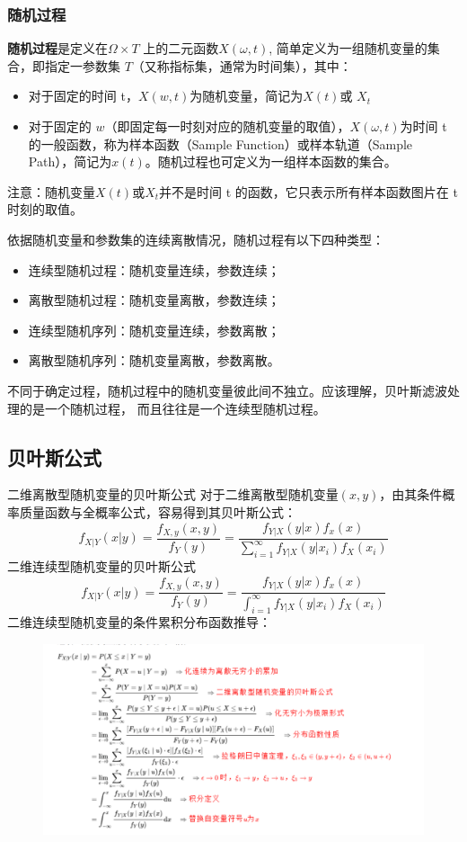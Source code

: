 \documentclass[12pt]{ctexart}
\begin{document}
\subsubsection{随机过程}
\textbf{随机过程}是定义在$\Omega × T$ 上的二元函数$X(\omega,t)$, 简单定义为一组随机变量的集合，即指定一参数集 $T$（又称指标集，通常为时间集），其中：
\begin{itemize}
    \item 对于固定的时间 t，$X(w,t)$为随机变量，简记为$X(t)$或 $X_t$
    \item 对于固定的 $w$（即固定每一时刻对应的随机变量的取值），$X(\omega,t)$为时间 t 的一般函数，称为样本函数（Sample Function）或样本轨道（Sample Path），简记为$x(t)$。随机过程也可定义为一组样本函数的集合。
\end{itemize}

注意：随机变量$X(t)$或$X_t$并不是时间 t 的函数，它只表示所有样本函数图片在 t 时刻的取值。

依据随机变量和参数集的连续离散情况，随机过程有以下四种类型：
\begin{itemize}
    \item 连续型随机过程：随机变量连续，参数连续；
    \item 离散型随机过程：随机变量离散，参数连续；
    \item 连续型随机序列：随机变量连续，参数离散；
    \item 离散型随机序列：随机变量离散，参数离散。
\end{itemize}

不同于确定过程，随机过程中的随机变量彼此间不独立。应该理解，贝叶斯滤波处理的是一个随机过程，
而且往往是一个连续型随机过程。

\subsection{贝叶斯公式}
\textcolor{myblue}{二维离散型随机变量的贝叶斯公式}
对于二维离散型随机变量$(x,y)$，由其条件概率质量函数与全概率公式，容易得到其贝叶斯公式：
\begin{equation}
    f_{X|Y}(x|y)=\frac{f_{X,y}(x,y)}{f_Y(y)}=\frac{f_{Y|X}(y|x)f_x(x)}{\sum_{i=1}^{\infty}f_{Y|X}(y|x_i)f_X(x_i)}
\end{equation}
\textcolor{myblue}{二维连续型随机变量的贝叶斯公式}
\begin{equation}
    f_{X|Y}(x|y)=\frac{f_{X,y}(x,y)}{f_Y(y)}=\frac{f_{Y|X}(y|x)f_x(x)}{\int_{i=1}^{\infty}f_{Y|X}(y|x_i)f_X(x_i)}
\end{equation}
二维连续型随机变量的条件累积分布函数推导：
\begin{figure}[h]
    \centering
    \includegraphics[width = 12cm]{image/4.png}
\end{figure}
\end{document}
